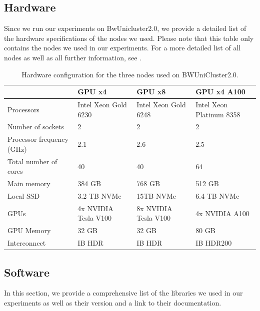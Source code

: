 \subsection{Hardware}
\label{sec:Appendix:Hardware}
Since we run our experiments on BwUnicluster2.0, we provide a detailed list of the hardware specifications of the nodes we used. Please
note that this table only contains the nodes we used in our experiments. For a more detailed list of all nodes as well as all further
information, see \cite{bwUniclusterHardware}.

\newpage

\begin{table}[!htb]
    \begin{tabularx}{\textwidth}{|X || X | X | X|} 
        \hline
         & GPU x4 & GPU x8 & GPU x4 A100 \\ 
        \hline
        \hline 
        Processors & Intel Xeon Gold 6230 & Intel Xeon Gold 6248 & Intel Xeon Platinum 8358  \\ 
        \hline
        Number of sockets & 2 & 2 & 2  \\ 
        \hline
        Processor frequency (GHz) & 2.1 & 2.6 & 2.5  \\ 
        \hline
        Total number of cores & 40 & 40 & 64  \\ 
        \hline
        Main memory & 384 GB & 768 GB & 512 GB  \\ 
        \hline
        Local SSD & 3.2 TB NVMe & 15TB NVMe & 6.4 TB NVMe  \\ 
        \hline
        GPUs & 4x NVIDIA Tesla V100 & 8x NVIDIA Tesla V100 & 4x NVIDIA A100  \\ 
        \hline
        GPU Memory & 32 GB  & 32 GB & 80 GB  \\ 
        \hline
        Interconnect & IB HDR & IB HDR & IB HDR200  \\ 
        \hline
    \end{tabularx}
    \caption{Hardware configuration for the three nodes used on BWUniCluster2.0. }
    \label{fig:HardwareSpec}
\end{table}


\subsection{Software}
\label{sec:Appendix:Software}
In this section, we provide a comprehensive list of the libraries we used in our experiments as well as their version
and a link to their documentation.

